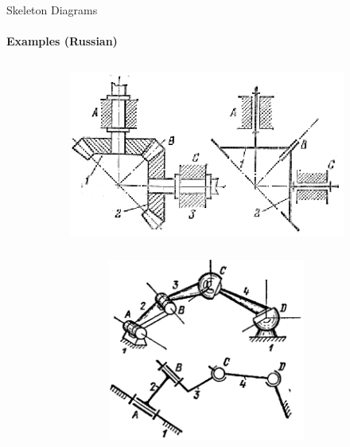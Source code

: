 \documentclass[aspectratio=169]{beamer}
\begin{document}
\begin{frame}[t]{Skeleton Diagrams}
\framesubtitle{Examples (Russian)}
\vspace{-0.5cm}
\begin{figure}[H]
    \begin{subfigure}[c]{0.49\textwidth}
        \centering\includegraphics[height=6cm,width=1\textwidth,keepaspectratio]{rus1_mech.png}
        \label{fig:rus1_mech.png}
    \end{subfigure}
    \begin{subfigure}[c]{0.49\textwidth}
        \centering\includegraphics[height=6cm,width=1\textwidth,keepaspectratio]{rus2_mech.png}
        \label{fig:rus2_mech.png}
    \end{subfigure}
\end{figure}
\end{frame}
\end{document}
